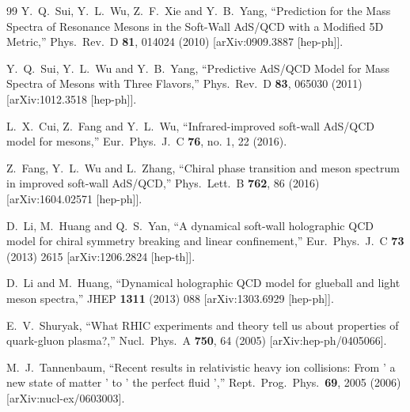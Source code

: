 \documentclass[11pt,a4paper,psfrag]{article}
\begin{document}
\begin{thebibliography}{99}
  Y.~Q.~Sui, Y.~L.~Wu, Z.~F.~Xie and Y.~B.~Yang,
  ``Prediction for the Mass Spectra of Resonance Mesons in the Soft-Wall AdS/QCD with a Modified 5D Metric,''
  Phys.\ Rev.\ D {\bf 81}, 014024 (2010)  [arXiv:0909.3887 [hep-ph]].

  Y.~Q.~Sui, Y.~L.~Wu and Y.~B.~Yang,
  ``Predictive AdS/QCD Model for Mass Spectra of Mesons with Three Flavors,''
  Phys.\ Rev.\ D {\bf 83}, 065030 (2011)  [arXiv:1012.3518 [hep-ph]].  %

  L.~X.~Cui, Z.~Fang and Y.~L.~Wu,
  ``Infrared-improved soft-wall AdS/QCD model for mesons,''
  Eur.\ Phys.\ J.\ C {\bf 76}, no. 1, 22 (2016).

  Z.~Fang, Y.~L.~Wu and L.~Zhang,
  ``Chiral phase transition and meson spectrum in improved soft-wall AdS/QCD,''
  Phys.\ Lett.\ B {\bf 762}, 86 (2016)
  [arXiv:1604.02571 [hep-ph]].

  D.~Li, M.~Huang and Q.~S.~Yan,
  ``A dynamical soft-wall holographic QCD model for chiral symmetry breaking and linear confinement,''
  Eur.\ Phys.\ J.\ C {\bf 73} (2013) 2615
  [arXiv:1206.2824 [hep-th]].

  D.~Li and M.~Huang,
  ``Dynamical holographic QCD model for glueball and light meson spectra,''
  JHEP {\bf 1311} (2013) 088
  [arXiv:1303.6929 [hep-ph]].



  E.~V.~Shuryak,
  ``What RHIC experiments and theory tell us about properties of  quark-gluon plasma?,''
  Nucl.\ Phys.\  A {\bf 750}, 64 (2005)
  [arXiv:hep-ph/0405066].

  M.~J.~Tannenbaum,
  ``Recent results in relativistic heavy ion collisions: From ' a new state of matter ' to ' the perfect fluid ',''
  Rept.\ Prog.\ Phys.\  {\bf 69}, 2005 (2006)
  [arXiv:nucl-ex/0603003].


\end{thebibliography}
\end{document}
